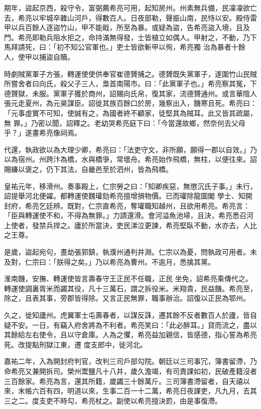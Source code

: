 \begin{pinyinscope}
 期年，盜起京西，殺守令，富弼薦希亮可用，起知房州。州素無兵備，民凜凜欲亡去，希亮以牢城卒雜山河戶，得數百人。日夜部勒，聲振山南，民恃以安。殿侍雷甲以兵百餘人逐盜竹山，甲不能戢，所至為暴。或疑為盜，告希亮盜入境，且及門。希亮即勒兵阻水拒之，命持滿無得發，士皆植立如偶人。甲射之，不動，乃下馬拜請死，曰：「初不知公官軍也。」吏士皆欲斬甲以徇，希亮獨
 治為暴者十餘人，使甲以捕盜自贖。



 時劇賊黨軍子方張，轉運使使供奉官崔德贇捕之。德贇既失黨軍子，遂圍竹山民賊所嘗舍者曰向氏，殺父子三人，梟首南陽市。曰：「此黨軍子也。」希亮察其冤，下德贇獄，未服。黨軍子獲於商州，詔賜向氏帛，復其家，流德贇通州。或言華陰人張元走夏州，為元昊謀臣。詔徙其族百餘口於房，幾察出入，饑寒且死。希亮曰：「元事虛實不可知，使誠有之，為國者終不顧家，徒堅其為賊耳。此又皆其疏屬，無
 罪。」乃密以聞，詔釋之。老幼哭希亮庭下曰：「今當還故鄉，然奈何去父母乎？」遂畫希亮像祠焉。



 代還，執政欲以為大理少卿，希亮曰：「法吏守文，非所願，願得一郡以自效。」乃以為宿州。州跨汴為橋，水與橋爭，常壞舟。希亮始作飛橋，無柱，以便往來。詔賜縑以褒之，仍下其法，自畿邑至於泗州，皆為飛橋。



 皇祐元年，移滑州。奏事殿上，仁宗勞之曰：「知卿疾惡，無懲沉氏子事。」未行，詔提舉河北便糴。都轉運使魏瓘劾希亮擅增損物價。已而瓘除龍圖閣
 學士、知開封府，希亮乞廷辨。既對，仁宗直希亮，奪瓘職知越州，且欲用希亮。希亮言：「臣與轉運使不和，不得為無罪。」力請還滑。會河溢魚池埽，且決，希亮悉召河上使者，發禁兵捍之。廬於所當決，吏民涕泣更諫，希亮堅臥不動，水亦去，人比之王尊。



 是歲，盜起宛句，晝劫張郭鎮，執濮州通判井淵。仁宗以為憂，問執政可用者。未及對，仁宗曰：「朕得之矣。」乃以希亮為曹州。不逾月，悉擒其黨。



 淮南饑，安撫、轉運使皆言壽春守王正民不任職，正民
 坐免，詔希亮乘傳代之。轉運使調裏胥米而蠲其役，凡十三萬石，謂之拆役米。米翔貴，民益饑。希亮至，除之，且表其事，旁郡皆得除。又言正民無罪，職事辦治。詔復以正民為鄂州。



 久之，徙知廬州。虎翼軍士屯壽春者，以謀反誅，遷其餘不反者數百人於廬，皆自疑不安。一日，有竊入府舍將為不利者。希亮笑曰：「此必醉耳。」貸而流之，盡以其餘給左右使令，且以守倉庫。人為之懼，希亮益加親信，皆感德，指心誓為希亮死。改提點刑獄江東，遷
 度支郎中，徙河北。



 嘉祐二年，入為開封府判官，改判三司戶部勾院。朝廷以三司事冗，簿書留滯，乃命希亮又兼開拆司。榮州鬻鹽凡十八井，歲久澹竭，有司責課如初，民破產籍沒者三百餘家。希亮為言，還其所籍，歲蠲三十餘萬斤。三司簿書滯留者，自天禧以來，末帳六百有四，明道以來，生事二百一十二萬，希亮日夜課吏，凡九月，去其三之二。度支吏不時勾，希亮杖之。副使以希亮擅決罰，由是事復滯。




\end{pinyinscope}
